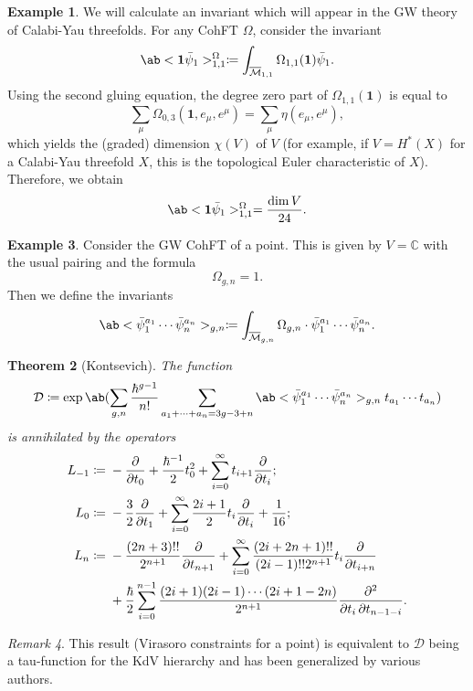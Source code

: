 \documentclass{amsart}
\newtheorem{thm}{Theorem}[section]
\theoremstyle{definition}
\newtheorem{exm}[thm]{Example}
\theoremstyle{remark}
\newtheorem{rmk}[thm]{Remark}
\theoremstyle{plain}
\theoremstyle{definition}
\theoremstyle{remark}
\newcommand{\C}{\mathbb{C}}
\newcommand{\Mbar}{\overline{\mathcal{M}}}
\newcommand{\mc}[1]{\mathcal{#1}}
\newcommand{\1}{\mathbf{1}}
\newcommand{\2}{\mathbf{2}}
\newcommand{\3}{\mathbf{3}}
\begin{document}
\begin{exm}
    We will calculate an invariant which will appear in the GW theory of Calabi-Yau threefolds. For any CohFT $\Omega$, consider the invariant
    \[ \ab<\1\bar{\psi}_1>_{1,1}^{\Omega}\coloneqq \int_{\Mbar_{1,1}} \Omega_{1,1}(\1)\bar{\psi}_1. \]
    Using the second gluing equation, the degree zero part of $\Omega_{1,1}(\1)$ is equal to
    \[ \sum_{\mu} \Omega_{0,3}(\1, e_{\mu}, e^{\mu}) = \sum_{\mu} \eta(e_{\mu}, e^{\mu}), \]
    which yields the (graded) dimension $\chi(V)$ of $V$ (for example, if \(V = H^*(X)\) for a Calabi-Yau threefold \(X\), this is the topological Euler characteristic of \(X\)). Therefore, we obtain
    \[ \ab<\1\bar{\psi}_1>_{1,1}^{\Omega} = \frac{\dim V}{24}. \]
\end{exm}

\begin{exm}
    Consider the GW CohFT of a point. This is given by $V = \C$ with the usual pairing and the formula 
    \[ \Omega_{g,n} = 1. \]
    Then we define the invariants
    \[ \ab<\bar{\psi}_1^{a_1} \cdots \bar{\psi}_n^{a_n}>_{g,n} \coloneqq \int_{\Mbar_{g,n}} \Omega_{g,n} \cdot \bar{\psi}_1^{a_1} \cdots \bar{\psi}_n^{a_n}. \]
    \begin{thm}[Kontsevich]
        The function
        \[ \mc{D} \coloneqq \exp \ab(\sum_{g,n} \frac{\hbar^{g-1}}{n!}\sum_{a_1 + \cdots + a_n = 3g-3+n} \ab<\bar{\psi}_1^{a_1} \cdots \bar{\psi}_n^{a_n}>_{g,n} t_{a_1}\cdots t_{a_n}) \]
        is annihilated by the operators
        \begin{align*}
            L_{-1} \coloneqq{}& -\pdv{}{t_0} + \frac{\hbar^{-1}}{2} t_0^2 + \sum_{i=0}^{\infty} t_{i+1} \pdv{}{t_i};\\
            L_0 \coloneqq{}& -\frac{3}{2} \pdv{}{t_1} + \sum_{i=0}^{\infty} \frac{2i+1}{2} t_i \pdv{}{t_i} + \frac{1}{16};\\
            L_n \coloneqq{}& -\frac{(2n+3)!!}{2^{n+1}} \pdv{}{t_{n+1}} + \sum_{i=0}^{\infty} \frac{(2i+2n+1)!!}{(2i-1)!! 2^{n+1}} t_i \pdv{}{t_{i+n}} \\
            &+ \frac{\hbar}{2} \sum_{i=0}^{n-1} \frac{(2i+1) (2i-1) \cdots (2i+1-2n)}{2^{n+1}} \pdv{}{t_i,t_{n-1-i}}.
        \end{align*}
    \end{thm}
\end{exm}

\begin{rmk}
    This result (Virasoro constraints for a point) is equivalent to $\mc{D}$ being a tau-function for the KdV hierarchy and has been generalized by various authors.
\end{rmk}
\end{document}
